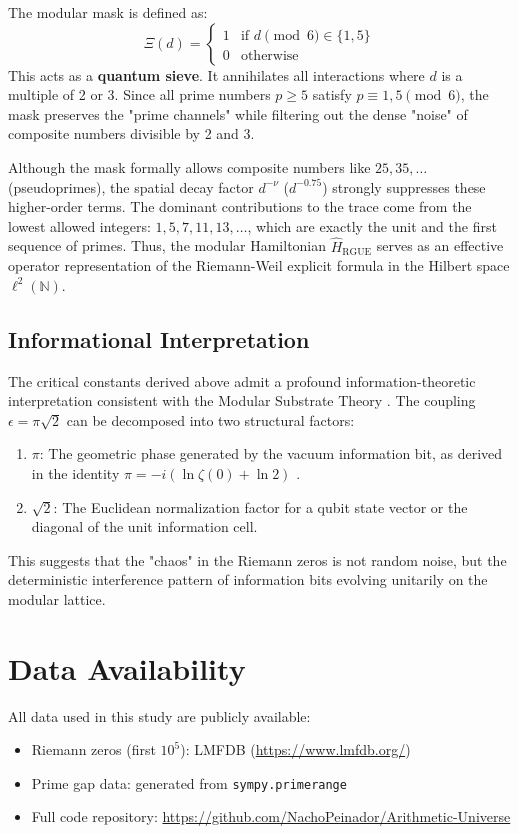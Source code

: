 \documentclass[prl,aps,floatfix,superscriptaddress,10pt]{revtex4-2}
\begin{document}
The modular mask is defined as:
\begin{equation}
\Xi(d) = \begin{cases} 1 & \text{if } d \pmod 6 \in \{1, 5\} \\ 0 & \text{otherwise} \end{cases}
\end{equation}
This acts as a \textbf{quantum sieve}. It annihilates all interactions where $d$ is a multiple of 2 or 3. Since all prime numbers $p \ge 5$ satisfy $p \equiv 1, 5 \pmod 6$, the mask preserves the "prime channels" while filtering out the dense "noise" of composite numbers divisible by 2 and 3.

Although the mask formally allows composite numbers like $25, 35, \dots$ (pseudoprimes), the spatial decay factor $d^{-\nu}$ ($d^{-0.75}$) strongly suppresses these higher-order terms. The dominant contributions to the trace come from the lowest allowed integers: $1, 5, 7, 11, 13, \dots$, which are exactly the unit and the first sequence of primes. Thus, the modular Hamiltonian $\hat{H}_{\text{RGUE}}$ serves as an effective operator representation of the Riemann-Weil explicit formula in the Hilbert space $\ell^2(\mathbb{N})$.

\subsection{Informational Interpretation}

The critical constants derived above admit a profound information-theoretic interpretation consistent with the Modular Substrate Theory \cite{PeinadorGenesis, PeinadorPi}. The coupling $\epsilon = \pi\sqrt{2}$ can be decomposed into two structural factors:
\begin{enumerate}
    \item $\pi$: The geometric phase generated by the vacuum information bit, as derived in the identity $\pi = -i(\ln \zeta(0) + \ln 2)$ \cite{PeinadorPi}.
    \item $\sqrt{2}$: The Euclidean normalization factor for a qubit state vector or the diagonal of the unit information cell.
\end{enumerate}
This suggests that the "chaos" in the Riemann zeros is not random noise, but the deterministic interference pattern of information bits evolving unitarily on the modular lattice.

\section{Data Availability}

All data used in this study are publicly available:
\begin{itemize}
    \item Riemann zeros (first $10^5$): LMFDB (\url{https://www.lmfdb.org/})
    \item Prime gap data: generated from \texttt{sympy.primerange}
    \item Full code repository: \url{https://github.com/NachoPeinador/Arithmetic-Universe}
\end{itemize}



\end{document}
